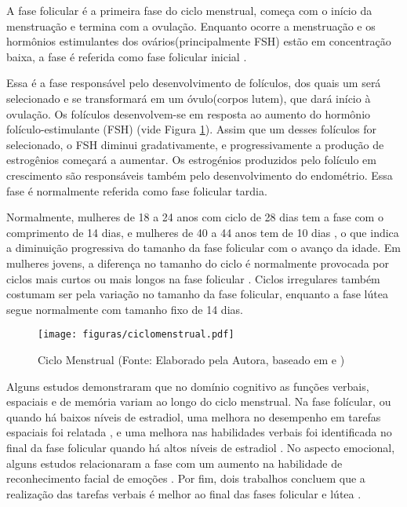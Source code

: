 A fase folicular é a primeira fase do ciclo menstrual, começa com o início
da menstruação e termina com a ovulação. Enquanto ocorre a menstruação e os
hormônios estimulantes dos ovários(principalmente FSH) estão em concentração
baixa, a fase é referida como fase folicular inicial \cite{lenton1984a}.

Essa é a fase responsável pelo desenvolvimento de folículos, dos quais um
será selecionado e se transformará em um óvulo(corpos lutem), que dará início
à ovulação. Os folículos desenvolvem-se em resposta ao aumento do hormônio
folículo-estimulante (FSH) (vide Figura \ref{fig01}). Assim que um desses 
folículos for selecionado, o FSH diminui gradativamente, e progressivamente a produção de
estrogênios começará a aumentar. Os estrogénios produzidos pelo folículo em
crescimento são responsáveis também pelo desenvolvimento do endométrio. Essa fase é normalmente 
referida como fase folicular tardia.


Normalmente, mulheres de 18 a 24 anos com ciclo de 28 dias tem a fase com
o comprimento de 14 dias, e mulheres de 40 a 44 anos tem de 10 dias
\cite{lenton1984a}, o que indica a diminuição progressiva do tamanho da
fase folicular com o avanço da idade. Em mulheres jovens, a diferença no
tamanho do ciclo é normalmente provocada por ciclos mais curtos ou mais
longos na fase folicular \cite{lenton1984a}. Ciclos irregulares também
costumam ser pela variação no tamanho da fase folicular, enquanto a fase
lútea segue normalmente com tamanho fixo de 14 dias.


\begin{figure}[h]
	\centering
	\texttt{[image: figuras/ciclomenstrual.pdf]}
	\caption{Ciclo Menstrual (Fonte: Elaborado pela Autora, baseado em \cite{draper2018} e \cite{reed2018})}
        \label{fig01}
\end{figure}

Alguns estudos demonstraram que no domínio cognitivo 
as funções verbais, espaciais e de memória variam ao longo do ciclo 
menstrual. Na fase folícular, ou quando há baixos níveis de estradiol, 
uma melhora no desempenho em tarefas espaciais foi relatada 
\cite{hausmann2000,maki2002, courvoisier2013, becker1982, phillips1992}, 
e uma melhora nas habilidades verbais foi identificada 
no final da fase folicular quando há altos níveis de estradiol 
\cite{Rosenberg2002}. No aspecto emocional, alguns estudos relacionaram a 
fase com um aumento na habilidade de reconhecimento facial de emoções 
\cite{derntl2013}. Por fim, dois trabalhos concluem que a realização das tarefas verbais é melhor 
ao final das fases folicular e lútea \cite{Rosenberg2002, solis2004}.


